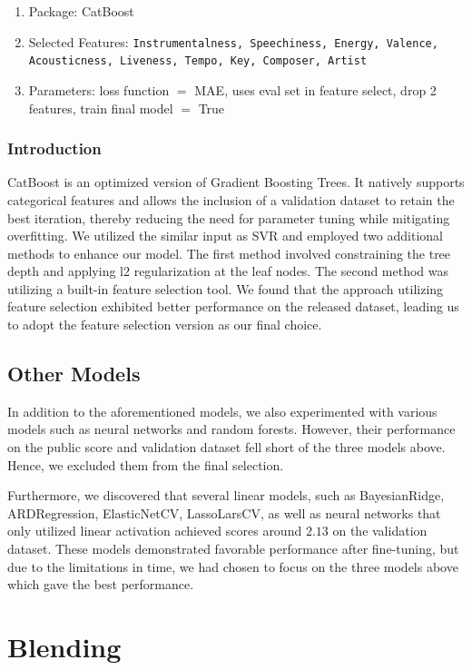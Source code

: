 \documentclass[10pt,letterpaper]{article}
\begin{document}
\begin{enumerate}
	\item Package: CatBoost
	\item Selected Features: \texttt{Instrumentalness, Speechiness, Energy, Valence, Acousticness, Liveness, Tempo, Key, Composer, Artist}
	\item Parameters: loss function $=$ MAE, uses eval set in feature select, drop 2 features, train final model $=$ True
\end{enumerate}

\subsubsection{Introduction}

CatBoost is an optimized version of Gradient Boosting Trees. It natively supports categorical features and allows the inclusion of a validation dataset to retain the best iteration, thereby reducing the need for parameter tuning while mitigating overfitting. We utilized the similar input as SVR and employed two additional methods to enhance our model. The first method involved constraining the tree depth and applying l2 regularization at the leaf nodes. The second method was utilizing a built-in feature selection tool. We found that the approach utilizing feature selection exhibited better performance on the released dataset, leading us to adopt the feature selection version as our final choice.

\subsection{Other Models}

In addition to the aforementioned models, we also experimented with various models such as neural networks and random forests. However, their performance on the public score and validation dataset fell short of the three models above. Hence, we excluded them from the final selection.

Furthermore, we discovered that several linear models, such as BayesianRidge, ARDRegression, ElasticNetCV, LassoLarsCV, as well as neural networks that only utilized linear activation achieved scores around $2.13$ on the validation dataset. These models demonstrated favorable performance after fine-tuning, but due to the limitations in time, we had chosen to focus on the three models above which gave the best performance. 

\section{Blending}
\end{document}
